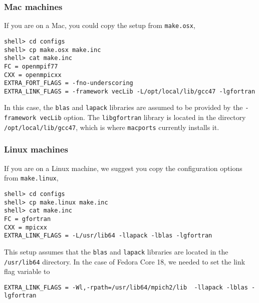 \documentclass[11pt]{article}
\begin{document}
\subsubsection{Mac machines}
If you are on a Mac, you could copy the setup from \verb+make.osx+,
\begin{verbatim}
shell> cd configs
shell> cp make.osx make.inc
shell> cat make.inc
FC = openmpif77
CXX = openmpicxx
EXTRA_FORT_FLAGS = -fno-underscoring
EXTRA_LINK_FLAGS = -framework vecLib -L/opt/local/lib/gcc47 -lgfortran
\end{verbatim}
In this case, the \verb+blas+ and \verb+lapack+ libraries are assumed to be provided by the
\verb+-framework vecLib+ option. The \verb+libgfortran+ library is located in the directory
\verb+/opt/local/lib/gcc47+, which is where \verb+macports+ currently installs it.

\subsubsection{Linux machines}
If you are on a Linux machine, we suggest you copy the configuration options from \verb+make.linux+,
\begin{verbatim}
shell> cd configs
shell> cp make.linux make.inc
shell> cat make.inc
FC = gfortran
CXX = mpicxx
EXTRA_LINK_FLAGS = -L/usr/lib64 -llapack -lblas -lgfortran
\end{verbatim}
This setup assumes that the \verb+blas+ and \verb+lapack+ libraries are located in the
\verb+/usr/lib64+ directory. 
In the case of Fedora Core 18, we needed to set the link flag variable to
\begin{verbatim}
EXTRA_LINK_FLAGS = -Wl,-rpath=/usr/lib64/mpich2/lib  -llapack -lblas -lgfortran
\end{verbatim}
\end{document}

